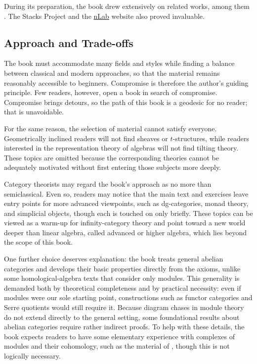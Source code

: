 During its preparation, the book drew extensively on related works, among them \cite{Wei94, ML98, KS06, Rie16, Yek20}. The Stacks Project \cite{stacks} and the \href{https://ncatlab.org}{nLab} website also proved invaluable.

\subsection*{Approach and Trade-offs}

The book must accommodate many fields and styles while finding a balance between classical and modern approaches, so that the material remains reasonably accessible to beginners. Compromise is therefore the author's guiding principle. Few readers, however, open a book in search of compromise. Compromise brings detours, so the path of this book is a geodesic for no reader; that is unavoidable.

For the same reason, the selection of material cannot satisfy everyone. Geometrically inclined readers will not find sheaves or $t$-structures, while readers interested in the representation theory of algebras will not find tilting theory. These topics are omitted because the corresponding theories cannot be adequately motivated without first entering those subjects more deeply.

Category theorists may regard the book's approach as no more than semiclassical. Even so, readers may notice that the main text and exercises leave entry points for more advanced viewpoints, such as dg-categories, monad theory, and simplicial objects, though each is touched on only briefly. These topics can be viewed as a warm-up for infinity-category theory and point toward a new world deeper than linear algebra, called advanced or higher algebra, which lies beyond the scope of this book.

One further choice deserves explanation: the book treats general abelian categories and develops their basic properties directly from the axioms, unlike some homological-algebra texts that consider only modules. This generality is demanded both by theoretical completeness and by practical necessity: even if modules were our sole starting point, constructions such as functor categories and Serre quotients would still require it. Because diagram chases in module theory do not extend directly to the general setting, some foundational results about abelian categories require rather indirect proofs. To help with these details, the book expects readers to have some elementary experience with complexes of modules and their cohomology, such as the material of \cite[Chapter~6]{Li1}, though this is not logically necessary.

